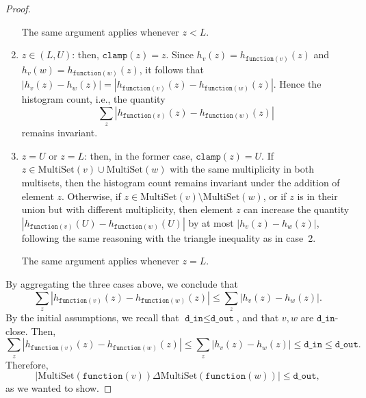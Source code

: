 \documentclass[11pt,a4paper]{article}
\theoremstyle{definition}
\newcommand{\MultiSet}{\mathrm{MultiSet}}
\newcommand{\din}{\texttt{d\_in}}
\newcommand{\dout}{\texttt{d\_out}}
\newcommand{\clamp}{\texttt{clamp}}
\newcommand{\function}{\texttt{function}}
\newcommand{\silvia}[1]{{ {\color{blue}{(silvia)~#1}}}}
\begin{document}
\begin{proof}
\begin{enumerate}
    
    
    The same argument applies whenever $z < L$. 
    
    \silvia{The first subcase discussed here, i.e., when $k_v = k_w$, is also proven by the triangle inequality expression above, but it seemed clean to separate the case where the total sum remains invariant.}
    
    \item $z \in (L, U)$: then, $\clamp(z) = z$. Since $h_v(z) = h_{\function(v)}(z)$ and $h_v(w) = h_{\function(w)}(z)$, it follows that $|h_v(z) - h_w(z)| = |h_{\function(v)}(z) - h_{\function(w)}(z)|$. Hence the histogram count, i.e., the quantity
     \[
        \sum_z |h_{\function(v)}(z) - h_{\function(w)}(z)|
    \]
    remains invariant.
    
    
    \item $z = U$ or $z = L$: then, in the former case, $\clamp(z) = U$. If $z \in \MultiSet(v) \cup \MultiSet(w)$ with the same multiplicity in both multisets, then the histogram count remains invariant under the addition of element $z$. Otherwise, if $z \in \MultiSet(v) \setminus \MultiSet(w)$, or if $z$ is in their union but with different multiplicity, then element $z$ can increase the quantity $|h_{\function(v)}(U) - h_{\function(w)}(U)|$ by at most $|h_v(z)-h_w(z)|$, following the same reasoning with the triangle inequality as in case~2.
    
    The same argument applies whenever $z = L$.
\end{enumerate}


By aggregating the three cases above, we conclude that
\[
\sum_z |h_{\function(v)}(z) - h_{\function(w)}(z)| \leq \sum_z |h_v(z) - h_w(z)|.
\]
By the initial assumptions, we recall that $\din \leq \dout$, and that $v, w$ are $\din$-close. Then,
\[
\sum_z |h_{\function(v)}(z) - h_{\function(w)}(z)| \leq \sum_z |h_v(z) - h_w(z)| \leq \din \leq \dout.
\]
Therefore, 
\[
|\MultiSet(\function(v)) \Delta \MultiSet(\function(w))| \leq \dout,
\]
as we wanted to show.
\end{proof}
\end{document}
